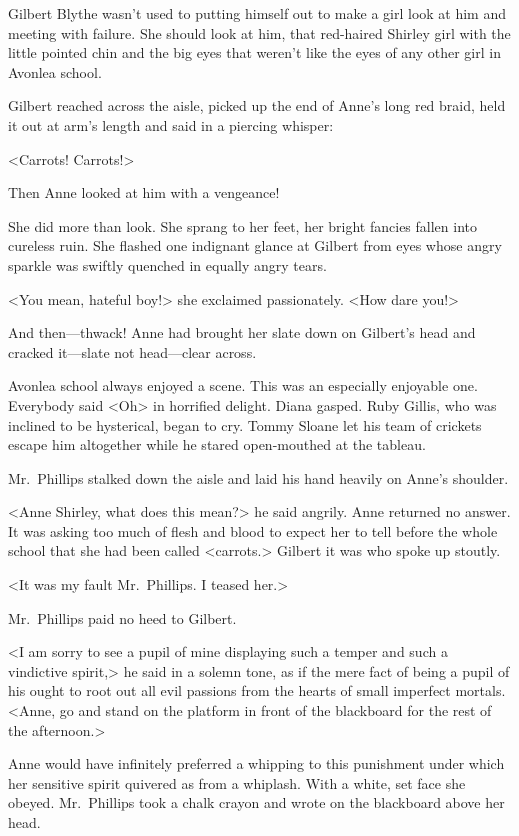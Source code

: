 Gilbert Blythe wasn't used to putting himself out to make a girl look at him and meeting with failure. She should look at him, that red-haired Shirley girl with the little pointed chin and the big eyes that weren't like the eyes of any other girl in Avonlea school.

Gilbert reached across the aisle, picked up the end of Anne's long red braid, held it out at arm's length and said in a piercing whisper:

<Carrots! Carrots!>

Then Anne looked at him with a vengeance!

She did more than look. She sprang to her feet, her bright fancies fallen into cureless ruin. She flashed one indignant glance at Gilbert from eyes whose angry sparkle was swiftly quenched in equally angry tears.

<You mean, hateful boy!> she exclaimed passionately. <How dare you!>

And then—thwack! Anne had brought her slate down on Gilbert's head and cracked it—slate not head—clear across.

Avonlea school always enjoyed a scene. This was an especially enjoyable one. Everybody said <Oh> in horrified delight. Diana gasped. Ruby Gillis, who was inclined to be hysterical, began to cry. Tommy Sloane let his team of crickets escape him altogether while he stared open-mouthed at the tableau.

Mr.~Phillips stalked down the aisle and laid his hand heavily on Anne's shoulder.

<Anne Shirley, what does this mean?> he said angrily. Anne returned no answer. It was asking too much of flesh and blood to expect her to tell before the whole school that she had been called <carrots.> Gilbert it was who spoke up stoutly.

<It was my fault Mr.~Phillips. I teased her.>

Mr.~Phillips paid no heed to Gilbert.

<I am sorry to see a pupil of mine displaying such a temper and such a vindictive spirit,> he said in a solemn tone, as if the mere fact of being a pupil of his ought to root out all evil passions from the hearts of small imperfect mortals. <Anne, go and stand on the platform in front of the blackboard for the rest of the afternoon.>

Anne would have infinitely preferred a whipping to this punishment under which her sensitive spirit quivered as from a whiplash. With a white, set face she obeyed. Mr.~Phillips took a chalk crayon and wrote on the blackboard above her head.

